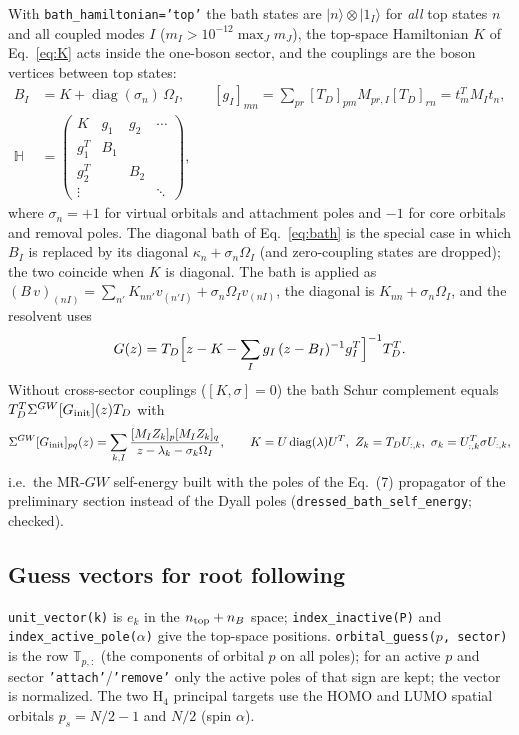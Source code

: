 \documentclass[11pt,a4paper]{article}
\newcommand{\bbH}{\mathbb{H}}
\newcommand{\bbT}{\mathbb{T}}
\newcommand{\ket}[1]{|#1\rangle}
\newcommand{\code}[1]{\texttt{#1}}
\begin{document}
With \code{bath\_hamiltonian='top'} the bath states are $\ket{n}\otimes\ket{1_I}$
for \emph{all} top states $n$ and all coupled modes $I$ ($m_I>10^{-12}\max_Jm_J$),
the top-space Hamiltonian $K$ of Eq.~\eqref{eq:K} acts inside the one-boson
sector, and the couplings are the boson vertices between top states:
\begin{align}
  B_I&=K+\operatorname{diag}(\sigma_n)\,\Omega_I,\qquad
  [g_I]_{mn}=\sum_{pr}[T_D]_{pm}M_{pr,I}[T_D]_{rn}=t_m^{T}M_It_n,
  \label{eq:dressed-bath}\\
  \bbH&=\begin{pmatrix}K&g_1&g_2&\cdots\\ g_1^{T}&B_1&&\\ g_2^{T}&&B_2&\\ \vdots&&&\ddots\end{pmatrix},\nonumber
\end{align}
where $\sigma_n=+1$ for virtual orbitals and attachment poles and $-1$ for
core orbitals and removal poles.  The diagonal bath of Eq.~\eqref{eq:bath}
is the special case in which $B_I$ is replaced by its diagonal
$\kappa_n+\sigma_n\Omega_I$ (and zero-coupling states are dropped); the two
coincide when $K$ is diagonal.  The bath is applied as
$(B\,v)_{(nI)}=\sum_{n'}K_{nn'}v_{(n'I)}+\sigma_n\Omega_Iv_{(nI)}$, the
diagonal is $K_{nn}+\sigma_n\Omega_I$, and the resolvent uses
\begin{equation}
  G(z)=T_D\Bigl[z-K-\sum_Ig_I\,(z-B_I)^{-1}g_I^{T}\Bigr]^{-1}T_D^{T}.
  \label{eq:dressed-schur}
\end{equation}
Without cross-sector couplings ($[K,\sigma]=0$) the bath Schur complement
equals $T_D^{T}\Sigma^{GW}[G_{\rm init}](z)T_D$ with
\begin{equation}
  \Sigma^{GW}[G_{\rm init}]_{pq}(z)=\sum_{k,I}\frac{[M_IZ_k]_p[M_IZ_k]_q}{z-\lambda_k-\sigma_k\Omega_I},
  \qquad K=U\operatorname{diag}(\lambda)U^{T},\ Z_k=T_DU_{:,k},\ \sigma_k=U_{:,k}^{T}\sigma U_{:,k},
  \label{eq:dressed-equiv}
\end{equation}
i.e.\ the MR-$GW$ self-energy built with the poles of the Eq.~(7) propagator
of the preliminary section instead of the Dyall poles
(\code{dressed\_bath\_self\_energy}; checked).

\subsection{Guess vectors for root following}

\code{unit\_vector(k)} is $e_k$ in the $n_{\rm top}+n_B$ space;
\code{index\_inactive(P)} and \code{index\_active\_pole($\alpha$)} give the
top-space positions.  \code{orbital\_guess($p$, sector)} is the row
$\bbT_{p,:}$ (the components of orbital $p$ on all poles); for an active $p$
and sector \code{'attach'}/\code{'remove'} only the active poles of that sign
are kept; the vector is normalized.  The two H$_4$ principal targets use the
HOMO and LUMO spatial orbitals $p_s=N/2-1$ and $N/2$ (spin $\alpha$).
\end{document}
